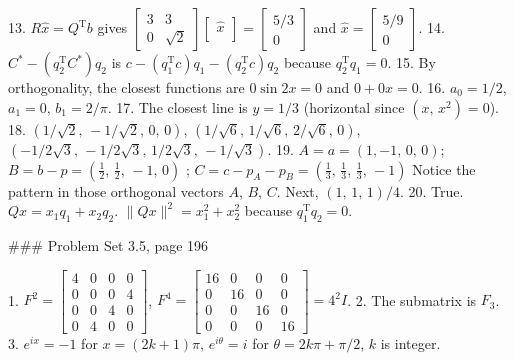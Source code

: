 13. \(R\widehat{x}=Q^{\mathrm{T}}b\) gives \(\begin{bmatrix}3&3\\ 0&\sqrt{2}\end{bmatrix}\begin{bmatrix}\widehat{x}\\ \end{bmatrix}=\begin{bmatrix}5/3\\ 0\end{bmatrix}\) and \(\widehat{x}=\begin{bmatrix}5/9\\ 0\end{bmatrix}\).
14. \(C^{*}-\left(q_{2}^{\mathrm{T}}C^{*}\right)q_{2}\) is \(c-\left(q_{1}^{\mathrm{T}}c\right)q_{1}-\left(q_{2}^{\mathrm{T}}c\right)q_{2}\) because \(q_{2}^{\mathrm{T}}q_{1}=0\).
15. By orthogonality, the closest functions are \(0\sin 2x=0\) and \(0+0x=0\).
16. \(a_{0}=1/2\), \(a_{1}=0\), \(b_{1}=2/\pi\).
17. The closest line is \(y=1/3\) (horizontal since \((x,\,x^{2})=0\)).
18. \((1/\sqrt{2},\,-1/\sqrt{2},\,0,\,0)\), \((1/\sqrt{6},\,1/\sqrt{6},\,2/\sqrt{6},\,0)\), \((-1/2\sqrt{3},\,-1/2\sqrt{3},\,1/2\sqrt{3},\,-1/\sqrt{3})\).
19. \(A=a=(1,-1,\,0,\,0)\); \(B=b-p=\left(\frac{1}{2},\,\frac{1}{2},\,-1,\,0\right)\) ; \(C=c-p_{A}-p_{B}=\left(\frac{1}{3},\,\frac{1}{3},\,\frac{1}{3},\,-1\right)\) Notice the pattern in those orthogonal vectors \(A\), \(B\), \(C\). Next, \((1,\,1,\,1)/4\).
20. True. \(Qx=x_{1}q_{1}+x_{2}q_{2}\). \(\|Qx\|^{2}=x_{1}^{2}+x_{2}^{2}\) because \(q_{1}^{\mathrm{T}}q_{2}=0\).

### Problem Set 3.5, page 196

1. \(F^{2}=\begin{bmatrix}4&0&0&0\\ 0&0&0&4\\ 0&0&4&0\\ 0&4&0&0\end{bmatrix}\), \(F^{4}=\begin{bmatrix}16&0&0&0\\ 0&16&0&0\\ 0&0&16&0\\ 0&0&0&16\end{bmatrix}=4^{2}I\).
2. The submatrix is \(F_{3}\).
3. \(e^{ix}=-1\) for \(x=(2k+1)\pi\), \(e^{i\theta}=i\) for \(\theta=2k\pi+\pi/2\), \(k\) is integer.

 